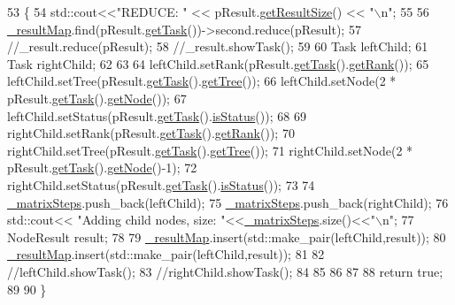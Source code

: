 \begin{DoxyCode}
53                                                     \{
54     std::cout<<\textcolor{stringliteral}{"REDUCE: "} << pResult.\hyperlink{classrdf_1_1NodeResult_a47e07daae11352e753629f2fca98d526}{getResultSize}() << \textcolor{stringliteral}{"\(\backslash\)n"};
55 
56     \hyperlink{classrdf_1_1ForestManager_ad764e01a338ea42ad8b2eaf360971875}{\_resultMap}.find(pResult.\hyperlink{classrdf_1_1NodeResult_a564d581492a48333ed9796f6fd4b8c6a}{getTask}())->second.reduce(pResult);
57     \textcolor{comment}{//\_result.reduce(pResult);}
58     \textcolor{comment}{//\_result.showTask();}
59     
60     Task leftChild; 
61     Task rightChild;
62     
63     
64     leftChild.setRank(pResult.\hyperlink{classrdf_1_1NodeResult_a564d581492a48333ed9796f6fd4b8c6a}{getTask}().\hyperlink{classrdf_1_1Task_ab1bcd01480e2c381541b6346f15cf4b7}{getRank}());
65     leftChild.setTree(pResult.\hyperlink{classrdf_1_1NodeResult_a564d581492a48333ed9796f6fd4b8c6a}{getTask}().\hyperlink{classrdf_1_1Task_a942297717d39a25db9ed8636ef72dca1}{getTree}());
66     leftChild.setNode(2 * pResult.\hyperlink{classrdf_1_1NodeResult_a564d581492a48333ed9796f6fd4b8c6a}{getTask}().\hyperlink{classrdf_1_1Task_abed5b1d313483299a04f0ccb63901c54}{getNode}());
67     leftChild.setStatus(pResult.\hyperlink{classrdf_1_1NodeResult_a564d581492a48333ed9796f6fd4b8c6a}{getTask}().\hyperlink{classrdf_1_1Task_a2d78d32594b0c8f76a599cc3883211c7}{isStatus}());
68     
69     rightChild.setRank(pResult.\hyperlink{classrdf_1_1NodeResult_a564d581492a48333ed9796f6fd4b8c6a}{getTask}().\hyperlink{classrdf_1_1Task_ab1bcd01480e2c381541b6346f15cf4b7}{getRank}());
70     rightChild.setTree(pResult.\hyperlink{classrdf_1_1NodeResult_a564d581492a48333ed9796f6fd4b8c6a}{getTask}().\hyperlink{classrdf_1_1Task_a942297717d39a25db9ed8636ef72dca1}{getTree}());
71     rightChild.setNode(2 * pResult.\hyperlink{classrdf_1_1NodeResult_a564d581492a48333ed9796f6fd4b8c6a}{getTask}().\hyperlink{classrdf_1_1Task_abed5b1d313483299a04f0ccb63901c54}{getNode}()-1);
72     rightChild.setStatus(pResult.\hyperlink{classrdf_1_1NodeResult_a564d581492a48333ed9796f6fd4b8c6a}{getTask}().\hyperlink{classrdf_1_1Task_a2d78d32594b0c8f76a599cc3883211c7}{isStatus}());
73     
74     \hyperlink{classrdf_1_1ForestManager_a34fac652fc47cf8af5f7b292219d85ed}{\_matrixSteps}.push\_back(leftChild);
75     \hyperlink{classrdf_1_1ForestManager_a34fac652fc47cf8af5f7b292219d85ed}{\_matrixSteps}.push\_back(rightChild);
76     std::cout<< \textcolor{stringliteral}{"Adding child nodes, size: "}<<\hyperlink{classrdf_1_1ForestManager_a34fac652fc47cf8af5f7b292219d85ed}{\_matrixSteps}.size()<<\textcolor{stringliteral}{"\(\backslash\)n"};
77     NodeResult result;
78     
79     \hyperlink{classrdf_1_1ForestManager_ad764e01a338ea42ad8b2eaf360971875}{\_resultMap}.insert(std::make\_pair(leftChild,result));
80     \hyperlink{classrdf_1_1ForestManager_ad764e01a338ea42ad8b2eaf360971875}{\_resultMap}.insert(std::make\_pair(leftChild,result));
81     
82     \textcolor{comment}{//leftChild.showTask();}
83     \textcolor{comment}{//rightChild.showTask();}
84     
85     
86     
87 
88     \textcolor{keywordflow}{return} \textcolor{keyword}{true};
89 
90 \}
\end{DoxyCode}
